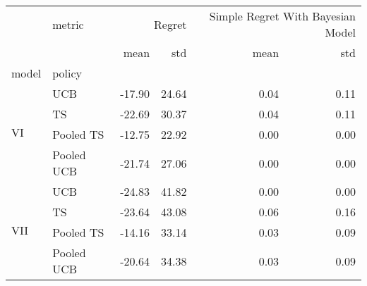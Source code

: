 \begin{tabular}{llrrrr}
\toprule
 & metric & \multicolumn{2}{r}{Regret} & \multicolumn{2}{r}{Simple Regret With Bayesian Model} \\
 &  & mean & std & mean & std \\
model & policy &  &  &  &  \\
\midrule
\multirow[c]{4}{*}{VI} & UCB & -17.90 & 24.64 & 0.04 & 0.11 \\
 & TS & -22.69 & 30.37 & 0.04 & 0.11 \\
 & Pooled TS & -12.75 & 22.92 & 0.00 & 0.00 \\
 & Pooled UCB & -21.74 & 27.06 & 0.00 & 0.00 \\
\multirow[c]{4}{*}{VII} & UCB & -24.83 & 41.82 & 0.00 & 0.00 \\
 & TS & -23.64 & 43.08 & 0.06 & 0.16 \\
 & Pooled TS & -14.16 & 33.14 & 0.03 & 0.09 \\
 & Pooled UCB & -20.64 & 34.38 & 0.03 & 0.09 \\
\bottomrule
\end{tabular}
